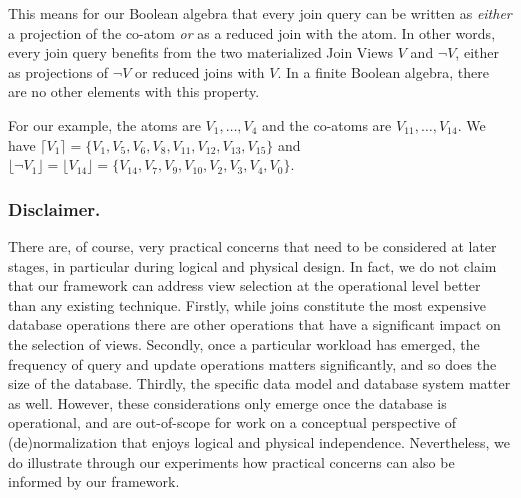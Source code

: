 \documentclass[sigconf]{acmart}
\begin{document}
This means for our Boolean algebra that every join query can be written as \emph{either} a projection of the co-atom \emph{or} as a reduced join with the atom. In other words, every join query benefits from the two materialized Join Views $V$ and $\neg V$, either as projections of $\neg V$ or reduced joins with $V$. In a finite Boolean algebra, there are no other elements with this property.

For our example, the atoms are $V_1,\ldots,V_4$ and the co-atoms are $V_{11},\ldots,V_{14}$. We have $\lceil V_1\rceil=\{V_1, V_5, V_6, V_8, V_{11}, V_{12}, V_{13}, V_{15}\}$ and $\lfloor \neg V_1\rfloor=\lfloor V_{14}\rfloor=\{V_{14},V_7,V_9,V_{10},V_2,V_3,V_4,V_0\}$.


\subsubsection{Disclaimer.} There are, of course, very practical concerns that need to be considered at later stages, in particular during logical and physical design. In fact, we do not claim that our framework can address view selection at the operational level better than any existing technique. Firstly, while joins constitute the most expensive database operations there are other operations that have a significant impact on the selection of views. Secondly, once a particular workload has emerged, the frequency of query and update operations matters significantly, and so does the size of the database. Thirdly, the specific data model and database system matter as well. However, these considerations only emerge once the database is operational, and are out-of-scope for work on a conceptual perspective of (de)normalization that enjoys logical and physical independence. Nevertheless, we do illustrate through our experiments how practical concerns can also be informed by our framework.
\end{document}
